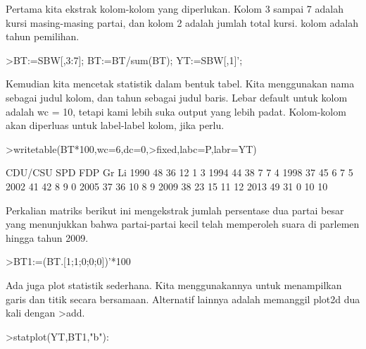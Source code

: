 \documentclass{article}
\begin{document}
\begin{eulernotebook}
\begin{eulercomment}
Pertama kita ekstrak kolom-kolom yang diperlukan. Kolom 3 sampai 7
adalah kursi masing-masing partai, dan kolom 2 adalah jumlah total
kursi. kolom adalah tahun pemilihan.
\end{eulercomment}
\begin{eulerprompt}
>BT:=SBW[,3:7]; BT:=BT/sum(BT); YT:=SBW[,1]';
\end{eulerprompt}
\begin{eulercomment}
Kemudian kita mencetak statistik dalam bentuk tabel. Kita menggunakan
nama sebagai judul kolom, dan tahun sebagai judul baris. Lebar default
untuk kolom adalah wc = 10, tetapi kami lebih suka output yang lebih
padat. Kolom-kolom akan diperluas untuk label-label kolom, jika perlu.
\end{eulercomment}
\begin{eulerprompt}
>writetable(BT*100,wc=6,dc=0,>fixed,labc=P,labr=YT)
\end{eulerprompt}
\begin{euleroutput}
         CDU/CSU   SPD   FDP    Gr    Li
    1990      48    36    12     1     3
    1994      44    38     7     7     4
    1998      37    45     6     7     5
    2002      41    42     8     9     0
    2005      37    36    10     8     9
    2009      38    23    15    11    12
    2013      49    31     0    10    10
\end{euleroutput}
\begin{eulercomment}
Perkalian matriks berikut ini mengekstrak jumlah persentase dua partai
besar yang menunjukkan bahwa partai-partai kecil telah memperoleh
suara di parlemen hingga tahun 2009.
\end{eulercomment}
\begin{eulerprompt}
>BT1:=(BT.[1;1;0;0;0])'*100
\end{eulerprompt}
\begin{euleroutput}
  [84.29,  81.25,  81.1659,  82.7529,  72.9642,  61.8971,  79.8732]
\end{euleroutput}
\begin{eulercomment}
Ada juga plot statistik sederhana. Kita menggunakannya untuk
menampilkan garis dan titik secara bersamaan. Alternatif lainnya
adalah memanggil plot2d dua kali dengan \textgreater{}add.
\end{eulercomment}
\begin{eulerprompt}
>statplot(YT,BT1,"b"):
\end{eulerprompt}
\begin{eulercomment}

\end{eulercomment}
\end{eulernotebook}
\end{document}
